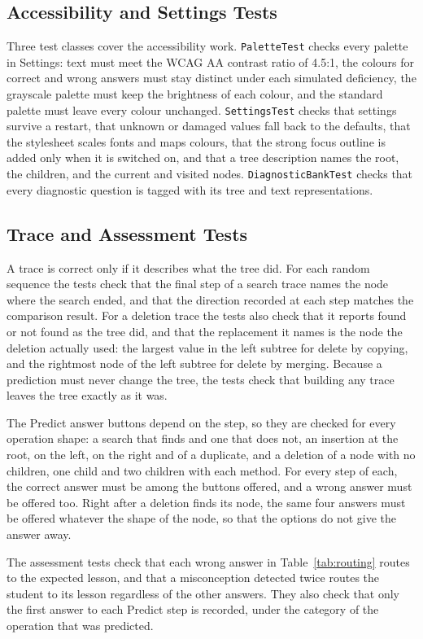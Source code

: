 \subsection{Accessibility and Settings Tests}
Three test classes cover the accessibility work. \texttt{PaletteTest} checks every palette in Settings: text must meet the WCAG AA contrast ratio of 4.5:1, the colours for correct and wrong answers must stay distinct under each simulated deficiency, the grayscale palette must keep the brightness of each colour, and the standard palette must leave every colour unchanged. \texttt{SettingsTest} checks that settings survive a restart, that unknown or damaged values fall back to the defaults, that the stylesheet scales fonts and maps colours, that the strong focus outline is added only when it is switched on, and that a tree description names the root, the children, and the current and visited nodes. \texttt{DiagnosticBankTest} checks that every diagnostic question is tagged with its tree and text representations.

\subsection{Trace and Assessment Tests}
A trace is correct only if it describes what the tree did. For each random sequence the tests check that the final step of a search trace names the node where the search ended, and that the direction recorded at each step matches the comparison result. For a deletion trace the tests also check that it reports found or not found as the tree did, and that the replacement it names is the node the deletion actually used: the largest value in the left subtree for delete by copying, and the rightmost node of the left subtree for delete by merging. Because a prediction must never change the tree, the tests check that building any trace leaves the tree exactly as it was.

The Predict answer buttons depend on the step, so they are checked for every operation shape: a search that finds and one that does not, an insertion at the root, on the left, on the right and of a duplicate, and a deletion of a node with no children, one child and two children with each method. For every step of each, the correct answer must be among the buttons offered, and a wrong answer must be offered too. Right after a deletion finds its node, the same four answers must be offered whatever the shape of the node, so that the options do not give the answer away.

The assessment tests check that each wrong answer in Table~\ref{tab:routing} routes to the expected lesson, and that a misconception detected twice routes the student to its lesson regardless of the other answers. They also check that only the first answer to each Predict step is recorded, under the category of the operation that was predicted.

